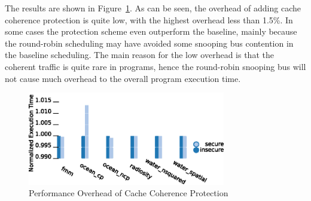 The results are shown in Figure~\ref{fig:splash2}. As can be seen, the overhead 
of adding cache coherence protection is
quite low, with the highest overhead less than 1.5\%. In some cases the 
protection scheme even outperform the baseline, mainly because the round-robin 
scheduling may have avoided some snooping bus contention in the baseline 
scheduling.  The main reason for the low overhead is that the coherent traffic 
is quite rare in programs, hence the round-robin
snooping bus will not cause much overhead to the overall program execution 
time.

\begin{figure}
    \begin{center}
        \includegraphics[width=3.4in]{figs/SPLASH.eps}
        \caption{Performance Overhead of Cache Coherence Protection}
        \label{fig:splash2}
    \end{center}
\end{figure}

